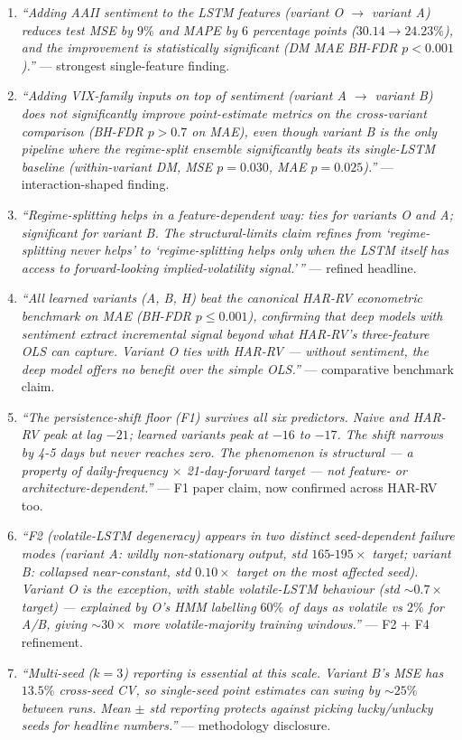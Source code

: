 \documentclass[11pt]{article}
\begin{document}
\begin{enumerate}[leftmargin=*]
  \item \emph{``Adding AAII sentiment to the LSTM features (variant O $\to$ variant A) reduces test MSE by $9\%$ and MAPE by $6$ percentage points ($30.14 \to 24.23\%$), and the improvement is statistically significant (DM MAE BH-FDR $p < 0.001$).''} --- strongest single-feature finding.

  \item \emph{``Adding VIX-family inputs on top of sentiment (variant A $\to$ variant B) does not significantly improve point-estimate metrics on the cross-variant comparison (BH-FDR $p > 0.7$ on MAE), even though variant B is the only pipeline where the regime-split ensemble significantly beats its single-LSTM baseline (within-variant DM, MSE $p = 0.030$, MAE $p = 0.025$).''} --- interaction-shaped finding.

  \item \emph{``Regime-splitting helps in a feature-dependent way: ties for variants O and A; significant for variant B. The structural-limits claim refines from `regime-splitting never helps' to `regime-splitting helps only when the LSTM itself has access to forward-looking implied-volatility signal.'\,''} --- refined headline.

  \item \emph{``All learned variants (A, B, H) beat the canonical HAR-RV econometric benchmark on MAE (BH-FDR $p \le 0.001$), confirming that deep models with sentiment extract incremental signal beyond what HAR-RV's three-feature OLS can capture. Variant O ties with HAR-RV --- without sentiment, the deep model offers no benefit over the simple OLS.''} --- comparative benchmark claim.

  \item \emph{``The persistence-shift floor (F1) survives all six predictors. Naive and HAR-RV peak at lag $-21$; learned variants peak at $-16$ to $-17$. The shift narrows by 4-5 days but never reaches zero. The phenomenon is structural --- a property of daily-frequency $\times$ 21-day-forward target --- not feature- or architecture-dependent.''} --- F1 paper claim, now confirmed across HAR-RV too.

  \item \emph{``F2 (volatile-LSTM degeneracy) appears in two distinct seed-dependent failure modes (variant A: wildly non-stationary output, std $165\text{-}195\times$ target; variant B: collapsed near-constant, std $0.10\times$ target on the most affected seed). Variant O is the exception, with stable volatile-LSTM behaviour (std $\sim 0.7\times$ target) --- explained by O's HMM labelling $60\%$ of days as volatile vs $2\%$ for A/B, giving $\sim 30\times$ more volatile-majority training windows.''} --- F2 + F4 refinement.

  \item \emph{``Multi-seed ($k = 3$) reporting is essential at this scale. Variant B's MSE has $13.5\%$ cross-seed CV, so single-seed point estimates can swing by $\sim 25\%$ between runs. Mean $\pm$ std reporting protects against picking lucky/unlucky seeds for headline numbers.''} --- methodology disclosure.
\end{enumerate}
\end{document}
